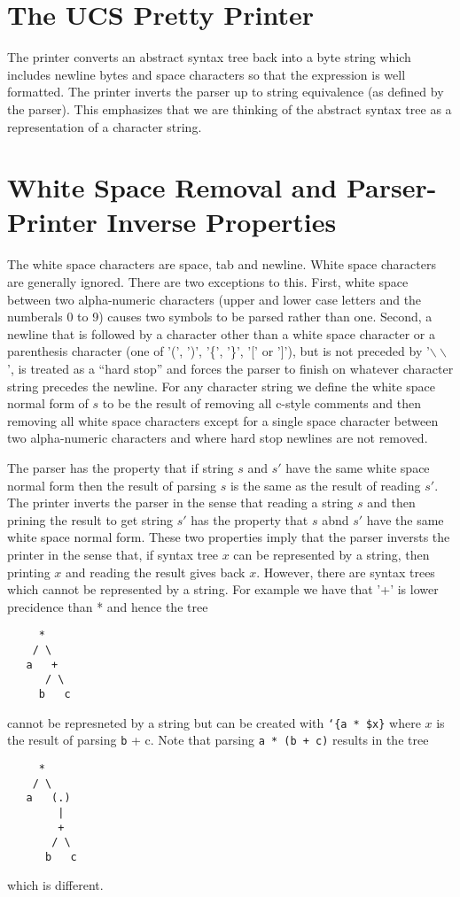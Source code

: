 \documentclass{article}
\newcommand{\mtt}[1]{\mbox{\tt #1}}
\begin{document}
\section{The UCS Pretty Printer}

The printer converts an abstract syntax tree back into a byte string which includes newline bytes and space characters
so that the expression is well formatted. The printer inverts the parser up to string equivalence (as defined by the parser).
This emphasizes that we are thinking of the abstract syntax tree as a representation of a character string.

\section{White Space Removal and Parser-Printer Inverse Properties}

The white space characters are space, tab and newline.  White space characters are generally ignored.  There are two exceptions to this.
First, white space between two alpha-numeric characters (upper and lower case letters and the numberals 0 to 9) causes two symbols to be parsed rather than one.
Second, a newline that is followed by a character other than a white space character or a parenthesis character (one of '(', ')', '\{', '\}', '[' or ']'), but is not preceded by '$\backslash\backslash$', is
treated as a ``hard stop''
and forces the parser to finish on whatever character string precedes the newline.
For any character string we define the white space normal form of $s$
to be the result of removing all c-style comments and then removing all white space characters except for
a single space character between two alpha-numeric characters and where hard stop newlines
are not removed.

The parser has the property that if string $s$ and $s'$ have the same white space normal form then the result of parsing
$s$ is the same as the result of reading $s'$.  The printer inverts the parser
in the sense that reading a string $s$ and then prining the result to get string $s'$ has the property that $s$ abnd $s'$ have the same white space normal form.
These two properties imply that the parser inversts the printer in the sense that, if syntax tree $x$ can be represented by a string, then printing $x$ and reading the result gives back $x$.
However, there are syntax trees which cannot be represented by a string.  For example we have that '+' is lower precidence than * and hence the tree
\begin{verbatim}
     *
    / \
   a   +
      / \
     b   c
\end{verbatim}
cannot be represneted by a string but can be created with {\tt `\{a * \$x\}} where $x$ is the result of parsing {\mtt b + c}.
Note that parsing {\tt a * (b + c)} results in the tree
\begin{verbatim}
     *
    / \
   a   (.)
        |
        +
       / \
      b   c
\end{verbatim}
which is different.
\end{document}
